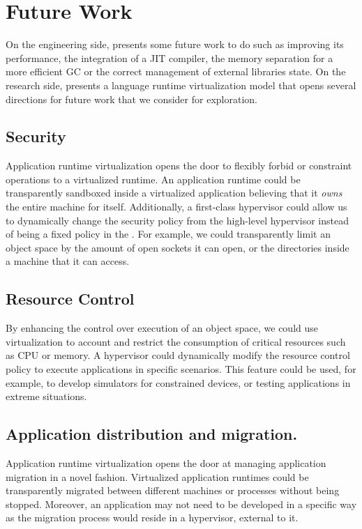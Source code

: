 \section{Future Work}

On the engineering side, \Vtt presents some future work to do such as improving its performance, the integration of a JIT compiler, the memory separation for a more efficient GC or the correct management of external libraries state. On the research side, \Vtt presents a language runtime virtualization model that opens several directions for future work that we consider for exploration.

\subsection{Security} Application runtime virtualization opens the door to flexibly forbid or constraint operations to a virtualized runtime. An application runtime could be transparently sandboxed inside a virtualized application believing that it \emph{owns} the entire machine for itself. Additionally, a first-class hypervisor could allow us to dynamically change the security policy from the high-level hypervisor instead of being a fixed policy in the \VM. For example, we could transparently limit an object space by the amount of open sockets it can open, or the directories inside a machine that it can access.

\subsection{Resource Control} By enhancing the control over execution of an object space, we could use virtualization to account and restrict the consumption of critical resources such as CPU or memory. A hypervisor could dynamically modify the resource control policy to execute applications in specific scenarios. This feature could be used, for example, to develop simulators for constrained devices, or testing applications in extreme situations.

\subsection{Application distribution and migration.} Application runtime virtualization opens the door at managing application migration in a novel fashion. Virtualized application runtimes could be transparently migrated between different machines or processes without being stopped. Moreover, an application may not need to be developed in a specific way as the migration process would reside in a hypervisor, external to it.

